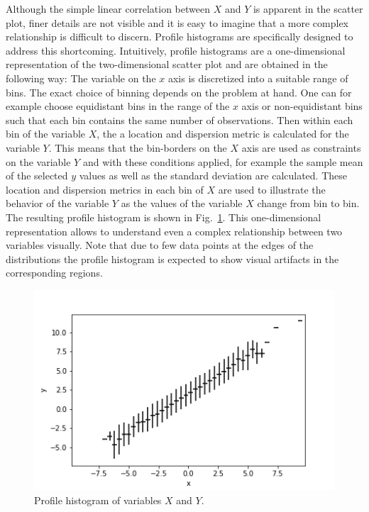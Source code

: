 \documentclass[BCOR=1mm, DIV=calc,10pt,
twoside=true,
twocolumn,
headings=normal]{scrartcl}
\newcommand{\fig}{Fig.~}
\begin{document}
Although the simple linear correlation between $X$ and $Y$ is apparent in the scatter plot, finer details are not visible and it is easy to imagine that a more complex relationship is difficult to discern. Profile histograms are specifically designed to address this shortcoming. Intuitively, profile histograms are a one-dimensional representation of the two-dimensional scatter plot and are obtained  in the following way: The variable on the $x$ axis is discretized into a suitable range of bins. The exact choice of binning depends on the problem at hand. One can for example choose equidistant bins in the range of the $x$ axis or non-equidistant bins such that each bin contains the same number of observations. Then within each bin of the variable $X$, the a location and dispersion metric is calculated for the variable $Y$. This means that the bin-borders on the $X$ axis are used as constraints on the variable $Y$ and with these conditions applied, for example the sample mean of the selected $y$ values as well as the standard deviation are calculated. These location and dispersion metrics in each bin of $X$ are used to illustrate the behavior of the variable $Y$ as the values of the variable $X$ change from bin to bin. The resulting profile histogram is shown in \fig \ref{fig:profile}. This one-dimensional representation allows to understand even a complex relationship between two variables visually. Note that due to few data points at the edges of the distributions the profile histogram is expected to show visual artifacts in the corresponding regions.

\begin{figure}
\begin{center}
\includegraphics[scale=0.5]{figs/profile}
\caption{\label{fig:profile} Profile histogram of variables $X$ and $Y$.}
\end{center}
\end{figure}
\end{document}
